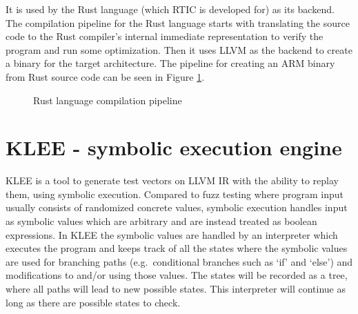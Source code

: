 It is used by the Rust language (which RTIC is developed for) as its backend.
The compilation pipeline for the Rust language starts with translating the
source code to the Rust compiler's internal immediate representation to
verify the program and run some optimization. Then it uses LLVM as the backend
to create a binary for the target architecture. The pipeline for creating an
ARM binary from Rust source code can be seen in Figure
\ref{figure:rustcompilation}.
\begin{figure}[h]
    \centering
    \caption{Rust language compilation pipeline}
    \label{figure:rustcompilation}
\end{figure}


\section{KLEE - symbolic execution engine}
KLEE\cite{kleepaper} is a tool to generate test vectors on LLVM IR with the
ability to replay them, using symbolic execution. Compared to fuzz testing
where program input usually consists of randomized concrete values, symbolic
execution handles input as symbolic values which are arbitrary and are instead
treated as boolean expressions. In KLEE the symbolic values are handled by an
interpreter which executes the program and keeps track of all the states where
the symbolic values are used for branching paths (e.g.\ conditional branches
such as `if' and `else') and modifications to and/or using those values. The
states will be recorded as a tree, where all paths will lead to new possible
states.  This interpreter will continue as long as there are possible states to
check.

